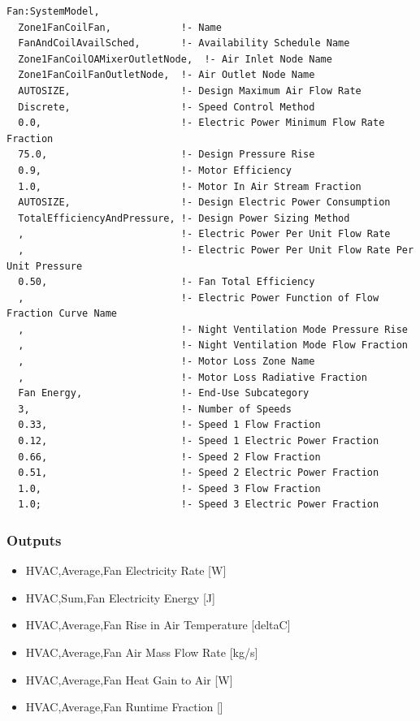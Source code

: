 \begin{lstlisting}
Fan:SystemModel,
  Zone1FanCoilFan,            !- Name
  FanAndCoilAvailSched,       !- Availability Schedule Name
  Zone1FanCoilOAMixerOutletNode,  !- Air Inlet Node Name
  Zone1FanCoilFanOutletNode,  !- Air Outlet Node Name
  AUTOSIZE,                   !- Design Maximum Air Flow Rate
  Discrete,                   !- Speed Control Method
  0.0,                        !- Electric Power Minimum Flow Rate Fraction
  75.0,                       !- Design Pressure Rise
  0.9,                        !- Motor Efficiency
  1.0,                        !- Motor In Air Stream Fraction
  AUTOSIZE,                   !- Design Electric Power Consumption
  TotalEfficiencyAndPressure, !- Design Power Sizing Method
  ,                           !- Electric Power Per Unit Flow Rate
  ,                           !- Electric Power Per Unit Flow Rate Per Unit Pressure
  0.50,                       !- Fan Total Efficiency
  ,                           !- Electric Power Function of Flow Fraction Curve Name
  ,                           !- Night Ventilation Mode Pressure Rise
  ,                           !- Night Ventilation Mode Flow Fraction
  ,                           !- Motor Loss Zone Name
  ,                           !- Motor Loss Radiative Fraction
  Fan Energy,                 !- End-Use Subcategory
  3,                          !- Number of Speeds
  0.33,                       !- Speed 1 Flow Fraction
  0.12,                       !- Speed 1 Electric Power Fraction
  0.66,                       !- Speed 2 Flow Fraction
  0.51,                       !- Speed 2 Electric Power Fraction
  1.0,                        !- Speed 3 Flow Fraction
  1.0;                        !- Speed 3 Electric Power Fraction
\end{lstlisting}

\subsubsection{Outputs}\label{outputs-fansysmodel}

\begin{itemize}
\item
  HVAC,Average,Fan Electricity Rate {[}W{]}
\item
  HVAC,Sum,Fan Electricity Energy {[}J{]}
\item
  HVAC,Average,Fan Rise in Air Temperature {[}deltaC{]}
\item
  HVAC,Average,Fan Air Mass Flow Rate {[}kg/s{]}
\item
  HVAC,Average,Fan Heat Gain to Air {[}W{]}
\item
  HVAC,Average,Fan Runtime Fraction {[]}
\end{itemize}

